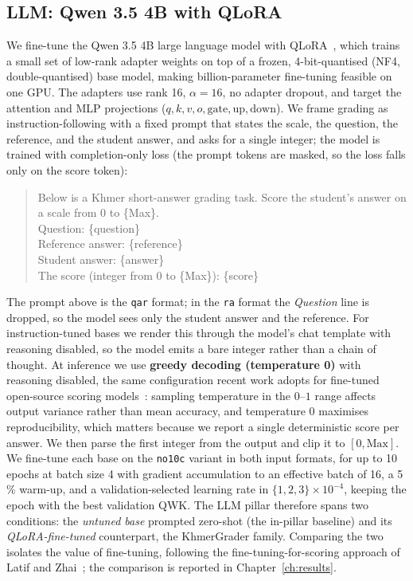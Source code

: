 \subsection{LLM: Qwen 3.5 4B with QLoRA}
We fine-tune the Qwen 3.5 4B large language model with QLoRA~\citep{dettmers2023qlora}, which trains a
small set of low-rank adapter weights on top of a frozen, 4-bit-quantised (NF4, double-quantised) base
model, making billion-parameter fine-tuning feasible on one GPU. The adapters use rank 16, $\alpha=16$,
no adapter dropout, and target the attention and MLP projections
($q,k,v,o,\mathrm{gate},\mathrm{up},\mathrm{down}$). We frame grading as instruction-following with a
fixed prompt that states the scale, the question, the reference, and the student answer, and asks for a
single integer; the model is trained with completion-only loss (the prompt tokens are masked, so the
loss falls only on the score token):

\begin{quote}\small\ttfamily
Below is a Khmer short-answer grading task. Score the student's answer on a scale from 0 to \{Max\}.\\[2pt]
Question: \{question\}\\
Reference answer: \{reference\}\\
Student answer: \{answer\}\\
The score (integer from 0 to \{Max\}): \{score\}
\end{quote}

\noindent The prompt above is the \texttt{qar} format; in the \texttt{ra} format the \emph{Question}
line is dropped, so the model sees only the student answer and the reference. For instruction-tuned
bases we render this through the model's chat template with reasoning
disabled, so the model emits a bare integer rather than a chain of thought. At inference we use
\textbf{greedy decoding (temperature 0)} with reasoning disabled, the same configuration recent work
adopts for fine-tuned open-source scoring models~\citep{solano2025narrowing}: sampling temperature in
the $0$--$1$ range affects output variance rather than mean accuracy, and temperature 0 maximises
reproducibility, which matters because we report a single deterministic score per answer. We then
parse the first integer from the output and clip it to $[0,\text{Max}]$. We fine-tune each base
on the \texttt{no10c} variant in both input formats, for up to
10 epochs at batch size 4 with gradient accumulation to an effective batch of 16, a 5\,\% warm-up, and a
validation-selected learning rate in $\{1,2,3\}\times10^{-4}$, keeping the epoch with the best
validation QWK. The LLM pillar therefore spans two conditions: the \emph{untuned base} prompted
zero-shot (the in-pillar baseline) and its \emph{QLoRA-fine-tuned} counterpart, the KhmerGrader
family. Comparing the two isolates the value of fine-tuning, following the fine-tuning-for-scoring
approach of Latif and Zhai~\citep{latif2024finetuning}; the comparison is reported in
Chapter~\ref{ch:results}.

